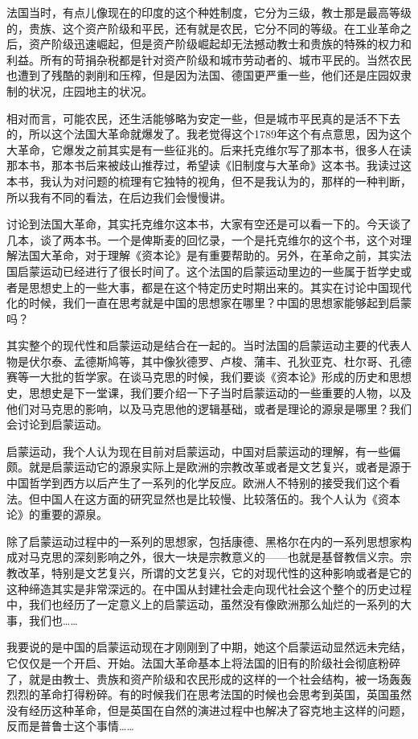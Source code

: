 \documentclass[UTF8, 12pt, a4paper]{ctexrep}
\begin{document}
法国当时，有点儿像现在的印度的这个种姓制度，它分为三级，教士那是最高等级的，贵族、这个资产阶级和平民，还有就是农民，它分不同的等级。在工业革命之后，资产阶级迅速崛起，但是资产阶级崛起却无法撼动教士和贵族的特殊的权力和利益。所有的苛捐杂税都是针对资产阶级和城市劳动者的、城市平民的。当然农民也遭到了残酷的剥削和压榨，但是因为法国、德国更严重一些，他们还是庄园奴隶制的状况，庄园地主的状况。

相对而言，可能农民，还生活能够略为安定一些，但是城市平民真的是活不下去的，所以这个法国大革命就爆发了。我老觉得这个1789年这个有点意思，因为这个大革命，它爆发之前其实是有一些征兆的。后来托克维尔写了那本书，很多人在读那本书，那本书后来被歧山推荐过，希望读《旧制度与大革命》这本书。我读过这本书，我认为对问题的梳理有它独特的视角，但不是我认为的，那样的一种判断，所以我有不同的看法，在后边我们会慢慢讲。

讨论到法国大革命，其实托克维尔这本书，大家有空还是可以看一下的。今天谈了几本，谈了两本书。一个是俾斯麦的回忆录，一个是托克维尔的这个书，这个对理解法国大革命，对于理解《资本论》是有重要帮助的。另外，在革命之前，其实法国启蒙运动已经进行了很长时间了。这个法国的启蒙运动里边的一些属于哲学史或者是思想史上的一些大事，都是在这个特定历史时期出来的。其实在讨论中国现代化的时候，我们一直在思考就是中国的思想家在哪里？中国的思想家能够起到启蒙吗？

其实整个的现代性和启蒙运动是结合在一起的。当时法国的启蒙运动主要的代表人物是伏尔泰、孟德斯鸠等，其中像狄德罗、卢梭、蒲丰、孔狄亚克、杜尔哥、孔德赛等一大批的哲学家。在谈马克思的时候，我们要谈《资本论》形成的历史和思想史，思想史是下一堂课，我们要介绍一下子当时启蒙运动的一些重要的人物，以及他们对马克思的影响，以及马克思他的逻辑基础，或者是理论的源泉是哪里？我们会讨论到启蒙运动。

启蒙运动，我个人认为现在目前对启蒙运动，中国对启蒙运动的理解，有一些偏颇。就是启蒙运动它的源泉实际上是欧洲的宗教改革或者是文艺复兴，或者是源于中国哲学到西方以后产生了一系列的化学反应。欧洲人不特别的接受我们这个看法。但中国人在这方面的研究显然也是比较慢、比较落伍的。我个人认为《资本论》的重要的源泉。

除了启蒙运动过程中的一系列的思想家，包括康德、黑格尔在内的一系列思想家构成对马克思的深刻影响之外，很大一块是宗教意义的——也就是基督教信义宗。宗教改革，特别是文艺复兴，所谓的文艺复兴，它的对现代性的这种影响或者是它的这种缔造其实是非常深远的。在中国从封建社会走向现代社会这个整个的历史过程中，我们也经历了一定意义上的启蒙运动，虽然没有像欧洲那么灿烂的一系列的大事，我们也……

我要说的是中国的启蒙运动现在才刚刚到了中期，她这个启蒙运动显然远未完结，它仅仅是一个开启、开始。法国大革命基本上将法国的旧有的阶级社会彻底粉碎了，就是由教士、贵族和资产阶级和农民形成的这样的一个社会结构，被一场轰轰烈烈的革命打得粉碎。有的时候我们在思考法国的时候也会思考到英国，英国虽然没有经历这种革命，但是英国在自然的演进过程中也解决了容克地主这样的问题，反而是普鲁士这个事情……
\end{document}
